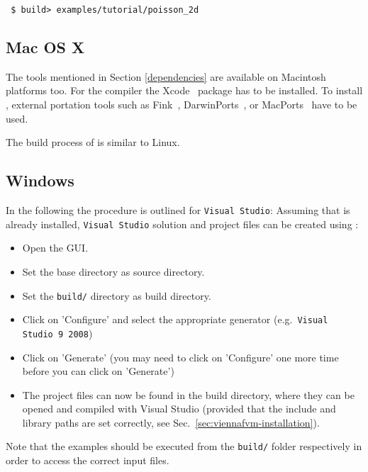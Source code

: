 \begin{lstlisting}
 $ build> examples/tutorial/poisson_2d
\end{lstlisting}

\subsection{Mac OS X}
\label{apple}
The tools mentioned in Section \ref{dependencies} are available on
Macintosh platforms too.
For the {\GCC} compiler the Xcode~\cite{xcode} package has to be installed.
To install {\CMake}, external portation tools such as
Fink~\cite{fink}, DarwinPorts~\cite{darwinports},
or MacPorts~\cite{macports} have to be used.

The build process of {\ViennaFVM} is similar to Linux.

\subsection{Windows}
In the following the procedure is outlined for \texttt{Visual Studio}: Assuming
that {\CMake} is already installed, \texttt{Visual Studio} solution
and project files can be created using {\CMake}:
\begin{itemize}
\item Open the {\CMake} GUI.
\item Set the {\ViennaFVM} base directory as source directory.
\item Set the \texttt{build/} directory as build directory.
\item Click on 'Configure' and select the appropriate generator
(e.g.~\texttt{Visual Studio 9 2008})
\item Click on 'Generate' (you may need to click on 'Configure' one more time
before you can click on 'Generate')
\item The project files can now be found in the {\ViennaFVM} build directory,
where they can be opened and compiled with Visual Studio (provided that the
include and library paths are set correctly, see
Sec.~\ref{sec:viennafvm-installation}).
\end{itemize}

Note that the examples should be executed from the \texttt{build/} folder respectively in order to access the correct input files.
